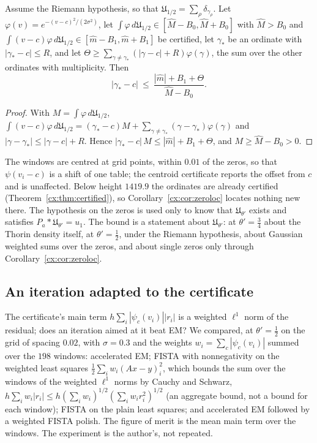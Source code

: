 \begin{corollary}\label{cx:cor:zeroloc}
Assume the Riemann hypothesis, so that $\mathfrak U_{1/2}=\sum_\rho\delta_{\gamma_\rho}$. Let $\varphi(v)=e^{-(v-c)^2/(2\sigma^2)}$, let $\int\varphi\,d\mathfrak U_{1/2}\in[\widehat M-B_0,\widehat M+B_0]$ with $\widehat M>B_0$ and $\int(v-c)\varphi\,d\mathfrak U_{1/2}\in[\widehat m-B_1,\widehat m+B_1]$ be certified, let $\gamma_*$ be an ordinate with $|\gamma_*-c|\le R$, and let $\Theta\ge\sum_{\gamma\ne\gamma_*}(|\gamma-c|+R)\varphi(\gamma)$, the sum over the other ordinates with multiplicity. Then
\[
|\gamma_*-c|\ \le\ \frac{|\widehat m|+B_1+\Theta}{\widehat M-B_0}.
\]
\end{corollary}

\begin{proof}
With $M=\int\varphi\,d\mathfrak U_{1/2}$, $\int(v-c)\varphi\,d\mathfrak U_{1/2}=(\gamma_*-c)M+\sum_{\gamma\ne\gamma_*}(\gamma-\gamma_*)\varphi(\gamma)$ and $|\gamma-\gamma_*|\le|\gamma-c|+R$. Hence $|\gamma_*-c|\,M\le|\widehat m|+B_1+\Theta$, and $M\ge\widehat M-B_0>0$.
\end{proof}

The windows are centred at grid points, within $0.01$ of the zeros, so that $\psi(v_i-c)$ is a shift of one table; the centroid certificate reports the offset from $c$ and is unaffected. Below height $1419.9$ the ordinates are already certified (Theorem~\ref{cx:thm:certified}), so Corollary~\ref{cx:cor:zeroloc} locates nothing new there. The hypothesis on the zeros is used only to know that $\mathfrak U_{\theta'}$ exists and satisfies $P_a*\mathfrak U_{\theta'}=u_1$. The bound is a statement about $\mathfrak U_{\theta'}$: at $\theta'=\tfrac34$ about the Thorin density itself, at $\theta'=\tfrac12$, under the Riemann hypothesis, about Gaussian weighted sums over the zeros, and about single zeros only through Corollary~\ref{cx:cor:zeroloc}.

\subsection{An iteration adapted to the certificate}\label{cx:sec:weighted}

The certificate's main term $h\sum_i|\psi_c(v_i)||r_i|$ is a weighted $\ell^1$ norm of the residual; does an iteration aimed at it beat EM? We compared, at $\theta'=\tfrac12$ on the grid of spacing $0.02$, with $\sigma=0.3$ and the weights $w_i=\sum_c|\psi_c(v_i)|$ summed over the $198$ windows: accelerated EM; FISTA with nonnegativity on the weighted least squares $\tfrac12\sum_iw_i(Ax-y)_i^2$, which bounds the sum over the windows of the weighted $\ell^1$ norms by Cauchy and Schwarz, $h\sum_iw_i|r_i|\le h(\sum_iw_i)^{1/2}(\sum_iw_ir_i^2)^{1/2}$ (an aggregate bound, not a bound for each window); FISTA on the plain least squares; and accelerated EM followed by a weighted FISTA polish. The figure of merit is the mean main term over the windows. The experiment is the author's, not repeated.

